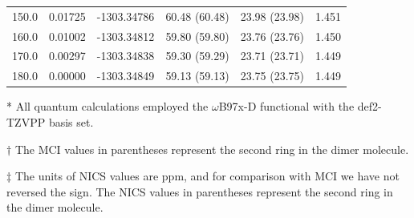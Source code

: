 \begin{table}[hbt!]
\begin{threeparttable}
\begin{tabular}{cccccc}
150.0 & 0.01725 & -1303.34786 & 60.48 (60.48) & 23.98 (23.98) & 1.451 \\
160.0 & 0.01002 & -1303.34812 & 59.80 (59.80) & 23.76 (23.76) & 1.450 \\
170.0 & 0.00297 & -1303.34838 & 59.30 (59.29) & 23.71 (23.71) & 1.449 \\
180.0 & 0.00000 & -1303.34849 & 59.13 (59.13) & 23.75 (23.75) & 1.449 \\ \bottomrule
\end{tabular}
\begin{tablenotes}
\item[*] \footnotesize All quantum calculations employed the $\omega$B97x-D functional with the def2-TZVPP basis set.
\item [$\dagger$] \footnotesize The MCI values in parentheses represent the second ring in the dimer molecule.
\item [$\ddagger$] \footnotesize The units of NICS values are ppm, and for comparison with MCI we have not reversed the sign. The NICS values in parentheses represent the second ring in the dimer molecule.
\end{tablenotes}
\end{threeparttable}
\end{table}

